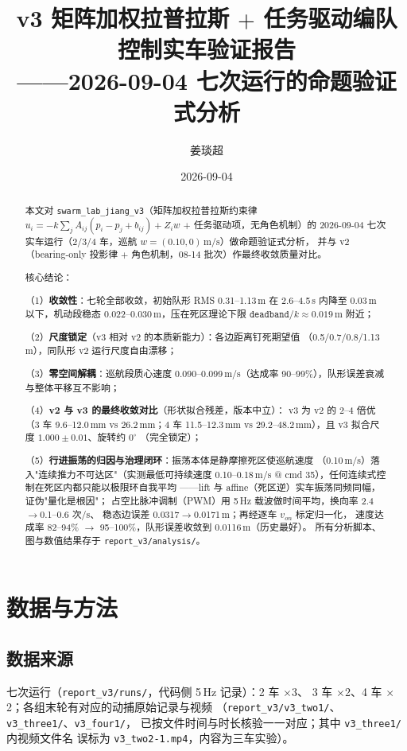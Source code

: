 \documentclass[11pt,a4paper]{ctexart}
\title{\textbf{v3 矩阵加权拉普拉斯 $+$ 任务驱动编队控制实车验证报告}\\[2pt]
\large ——2026-09-04 七次运行的命题验证式分析}
\author{姜琰超}
\date{2026-09-04}
\newcommand{\file}[1]{\texttt{#1}}
\newcommand{\degC}{^\circ}
\begin{document}
\maketitle

\begin{abstract}
本文对 \file{swarm\_lab\_jiang\_v3}（矩阵加权拉普拉斯约束律
$u_i=-k\sum_j A_{ij}(p_i-p_j+b_{ij})+Z_i w$ $+$ 任务驱动项，无角色机制）的
2026-09-04 七次实车运行（2/3/4 车，巡航 $w=(0.10,0)$\,m/s）做命题验证式分析，
并与 v2（bearing-only 投影律 $+$ 角色机制，08-14 批次）作最终收敛质量对比。

核心结论：

（1）\textbf{收敛性}：七轮全部收敛，初始队形 RMS 0.31--1.13\,m 在 2.6--4.5\,s
内降至 0.03\,m 以下，机动段稳态 0.022--0.030\,m，压在死区理论下限
$\texttt{deadband}/k\approx0.019$\,m 附近；

（2）\textbf{尺度锁定}（v3 相对 v2 的本质新能力）：各边距离钉死期望值
（0.5/0.7/0.8/1.13\,m），同队形 v2 运行尺度自由漂移；

（3）\textbf{零空间解耦}：巡航段质心速度 0.090--0.099\,m/s（达成率
90--99\%），队形误差衰减与整体平移互不影响；

（4）\textbf{v2 与 v3 的最终收敛对比}（形状拟合残差，版本中立）：
v3 为 v2 的 2--4 倍优（3 车 9.6--12.0\,mm vs 26.2\,mm；4 车 11.5--12.3\,mm
vs 29.2--48.2\,mm），且 v3 拟合尺度 $1.000\pm0.01$、旋转约 $0\degC$
（完全锁定）；

（5）\textbf{行进振荡的归因与治理闭环}：振荡本体是静摩擦死区使巡航速度
（0.10\,m/s）落入"连续推力不可达区"（实测最低可持续速度
0.10--0.18\,m/s @ cmd 35），任何连续式控制在死区内都只能以极限环自我平均
——lift 与 affine（死区逆）实车振荡同频同幅，证伪"量化是根因"；
占空比脉冲调制（PWM）用 5\,Hz 载波做时间平均，换向率 2.4$\to$0.1--0.6 次/s、
稳态边误差 0.0317$\to$0.0171\,m；再经逐车 $v_{on}$ 标定归一化，
速度达成率 82--94\% $\to$ 95--100\%，队形误差收敛到 0.0116\,m（历史最好）。
所有分析脚本、图与数值结果存于 \file{report\_v3/analysis/}。
\end{abstract}

\section{数据与方法}

\subsection{数据来源}

七次运行（\file{report\_v3/runs/}，代码侧 5\,Hz 记录）：2 车 $\times$3、
3 车 $\times$2、4 车 $\times$2；各组末轮有对应的动捕原始记录与视频
（\file{report\_v3/v3\_two1/}、\file{v3\_three1/}、\file{v3\_four1/}，
已按文件时间与时长核验一一对应；其中 \file{v3\_three1/} 内视频文件名
误标为 \file{v3\_two2-1.mp4}，内容为三车实验）。
\end{document}
